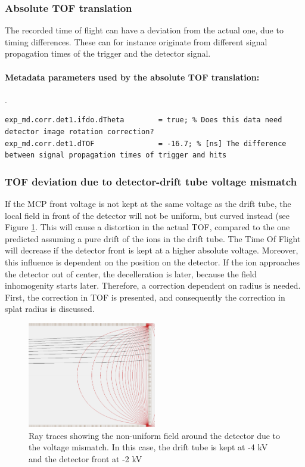 \subsubsection{Absolute TOF translation}
The recorded time of flight can have a deviation from the actual one, due to timing differences. These can for instance originate from different signal propagation times of the trigger and the detector signal.

\paragraph{Metadata parameters used by the absolute TOF translation:}
.\newline
\lstset{language=MATLAB}
\begin{lstlisting}
exp_md.corr.det1.ifdo.dTheta 		= true; % Does this data need detector image rotation correction?
exp_md.corr.det1.dTOF 			 	= -16.7; % [ns] The difference between signal propagation times of trigger and hits
\end{lstlisting}


\subsubsection{TOF deviation due to detector-drift tube voltage mismatch}

If the MCP front voltage is not kept at the same voltage as the drift tube, the local field in front of the detector will not be uniform, but curved instead (see Figure \ref{detector_abberation_ray_traces}. This will cause a distortion in the actual TOF, compared to the one predicted assuming a pure drift of the ions in the drift tube. The Time Of Flight will decrease if the detector front is kept at a higher absolute voltage. Moreover, this influence is dependent on the position on the detector. If the ion approaches the detector out of center, the decelleration is later, because the field inhomogenity starts later. Therefore, a correction dependent on radius is needed. First, the correction in TOF is presented, and consequently the correction in splat radius is discussed.

\begin{figure}[h]
   \centering
    \centerline{\includegraphics[width=0.5\textwidth]{Graphics/detector_abberation_ray_traces.png}}
\caption{Ray traces showing the non-uniform field around the detector due to the voltage mismatch. In this case, the drift tube is kept at -4 kV and the detector front at -2 kV}
\label{detector_abberation_ray_traces}
\end{figure}


